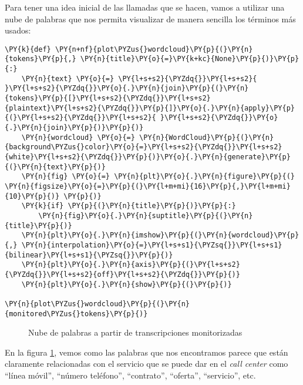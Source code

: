     Para tener una idea inicial de las llamadas que se hacen, vamos a utilizar 
una nube de palabras que nos permita visualizar de manera sencilla los
términos más usados:
\vspace{0.5cm}
    \begin{tcolorbox}[breakable, size=fbox, boxrule=1pt, pad at break*=1mm,colback=cellbackground, colframe=cellborder]
\begin{Verbatim}[commandchars=\\\{\}]
\PY{k}{def} \PY{n+nf}{plot\PYZus{}wordcloud}\PY{p}{(}\PY{n}{tokens}\PY{p}{,} \PY{n}{title}\PY{o}{=}\PY{k+kc}{None}\PY{p}{)}\PY{p}{:}
    \PY{n}{text} \PY{o}{=} \PY{l+s+s2}{\PYZdq{}}\PY{l+s+s2}{ }\PY{l+s+s2}{\PYZdq{}}\PY{o}{.}\PY{n}{join}\PY{p}{(}\PY{n}{tokens}\PY{p}{[}\PY{l+s+s2}{\PYZdq{}}\PY{l+s+s2}{plaintext}\PY{l+s+s2}{\PYZdq{}}\PY{p}{]}\PY{o}{.}\PY{n}{apply}\PY{p}{(}\PY{l+s+s2}{\PYZdq{}}\PY{l+s+s2}{ }\PY{l+s+s2}{\PYZdq{}}\PY{o}{.}\PY{n}{join}\PY{p}{)}\PY{p}{)}
    \PY{n}{wordcloud} \PY{o}{=} \PY{n}{WordCloud}\PY{p}{(}\PY{n}{background\PYZus{}color}\PY{o}{=}\PY{l+s+s2}{\PYZdq{}}\PY{l+s+s2}{white}\PY{l+s+s2}{\PYZdq{}}\PY{p}{)}\PY{o}{.}\PY{n}{generate}\PY{p}{(}\PY{n}{text}\PY{p}{)}
    \PY{n}{fig} \PY{o}{=} \PY{n}{plt}\PY{o}{.}\PY{n}{figure}\PY{p}{(} \PY{n}{figsize}\PY{o}{=}\PY{p}{(}\PY{l+m+mi}{16}\PY{p}{,}\PY{l+m+mi}{10}\PY{p}{)} \PY{p}{)}
    \PY{k}{if} \PY{p}{(}\PY{n}{title}\PY{p}{)}\PY{p}{:}
        \PY{n}{fig}\PY{o}{.}\PY{n}{suptitle}\PY{p}{(}\PY{n}{title}\PY{p}{)}
    \PY{n}{plt}\PY{o}{.}\PY{n}{imshow}\PY{p}{(}\PY{n}{wordcloud}\PY{p}{,} \PY{n}{interpolation}\PY{o}{=}\PY{l+s+s1}{\PYZsq{}}\PY{l+s+s1}{bilinear}\PY{l+s+s1}{\PYZsq{}}\PY{p}{)}
    \PY{n}{plt}\PY{o}{.}\PY{n}{axis}\PY{p}{(}\PY{l+s+s2}{\PYZdq{}}\PY{l+s+s2}{off}\PY{l+s+s2}{\PYZdq{}}\PY{p}{)}
    \PY{n}{plt}\PY{o}{.}\PY{n}{show}\PY{p}{(}\PY{p}{)}
    
\PY{n}{plot\PYZus{}wordcloud}\PY{p}{(}\PY{n}{monitored\PYZus{}tokens}\PY{p}{)}
\end{Verbatim}
\end{tcolorbox}

    
    
\begin{figure}[!ht]
	\centering
    \caption{Nube de palabras a partir de transcripciones monitorizadas}
    \label{fig:cloudmoni}
\end{figure}    
    
 En la figura \ref{fig:cloudmoni}, vemos como las palabras que nos encontramos parece que están claramente
relacionadas con el servicio que se puede dar en el \textit{call center} como
``línea móvil'', ``número teléfono'', ``contrato'', ``oferta'',
``servicio'', etc.

